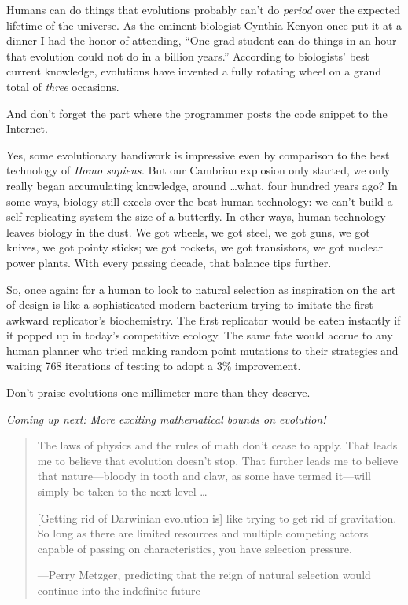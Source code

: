 {
 Humans can do things that evolutions probably
can't do \textit{period} over the expected lifetime of
the universe. As the eminent biologist Cynthia Kenyon once put it at a
dinner I had the honor of attending, ``One grad
student can do things in an hour that evolution could not do in a
billion years.'' According to
biologists' best current knowledge, evolutions have
invented a fully rotating wheel on a grand total of \textit{three}
occasions.}

{
 And don't forget the part where the programmer
posts the code snippet to the Internet.}

{
 Yes, some evolutionary handiwork is impressive even by comparison
to the best technology of \textit{Homo sapiens.} But our Cambrian
explosion only started, we only really began accumulating knowledge,
around \ldots what, four hundred years ago? In some ways, biology still
excels over the best human technology: we can't build a
self-replicating system the size of a butterfly. In other ways, human
technology leaves biology in the dust. We got wheels, we got steel, we
got guns, we got knives, we got pointy sticks; we got rockets, we got
transistors, we got nuclear power plants. With every passing decade,
that balance tips further.}

{
 So, once again: for a human to look to natural selection as
inspiration on the art of design is like a sophisticated modern
bacterium trying to imitate the first awkward
replicator's biochemistry. The first replicator would
be eaten instantly if it popped up in today's
competitive ecology. The same fate would accrue to any human planner
who tried making random point mutations to their strategies and waiting
768 iterations of testing to adopt a 3\% improvement.}

{
 Don't praise evolutions one millimeter more than
they deserve.}

{
 \textit{Coming up next: More exciting mathematical bounds on
evolution!}}

\myendsectiontext


\bigskip


\begin{quotation}
{
 The laws of physics and the rules of math don't
cease to apply. That leads me to believe that evolution
doesn't stop. That further leads me to believe that
nature---bloody in tooth and claw, as some have termed it---will simply
be taken to the next level \ldots}

{
 [Getting rid of Darwinian evolution is] like trying to get rid of
gravitation. So long as there are limited resources and multiple
competing actors capable of passing on characteristics, you have
selection pressure.}

{\raggedleft
 {}---Perry Metzger, predicting that the reign of natural selection
would continue into the indefinite future
\par}
\end{quotation}


